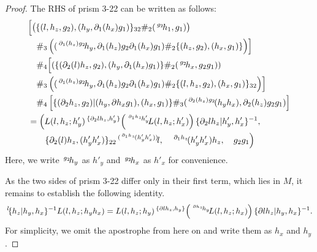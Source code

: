 \documentclass[11pt, reqno]{amsart} %
\newcommand{\act}[1]{\,\sp{#1}\!}
\newcommand{\del}{\partial}
\theoremstyle{definition}
\theoremstyle{remark}
\numberwithin{equation}{section}
\begin{document}
\begin{proof}
The RHS of prism 3-22 can be written as follows:
\begin{align}
  \nonumber
  & 
  \Bigl[
    \big(\{ (l, h_z,g_2), \left(h_y, \del_1(h_x) g_1\right)\}_{32} \#_2 (\act{g_2}h_1, g_1 ) \big) \\
    \nonumber
    &\quad \#_3 
    \left( (\act{\del_1(h_z)g_2}h_y, \del_1(h_z)g_2\del_1(h_x)g_1) \#_2\{ (h_z,g_2), (h_x, g_1)\} \right)
  \Bigr] \\
  \nonumber
  &\quad \#_4
  \Bigl[
    \left(\{(\del_2(l)h_z,g_2), (h_y,\del_1(h_x)g_1) \} \#_2 (\act{g_2}h_x, g_2g_1) \right) \\
    \nonumber
    &\quad \#_3
    \left( (\act{\del_1(h_z)g_2}h_y, \del_1(h_z)g_2\del_1(h_x)g_1)\#_2\{(l,h_z,g_2), (h_x,g_1)\}_{32} \right)
  \Bigr] \\
  \nonumber
  &\quad \#_4 
  \left[ 
    \{(\del_2 h_z, g_2)|(h_y, \del h_x g_1), (h_x, g_1) \} 
    \#_3 
    (\act{\del_2(h_z)g_2}(h_yh_x), \del_2(h_z)g_2g_1) 
  \right] \\
  \nonumber
  &= 
  \Bigl(
    L(l,h_z;h'_y)\act{\{\partial_2 lh_z,h'_y\}}\left(\act{\act{\partial_1 h_z}h'_y}L(l,h_z;h'_x)\right)\{\partial_2 lh_z|h'_y,h'_x\}^{-1}, \\
    &\qquad\{\del_2(l)h_z,(h'_yh'_x)\}_{22}\act{(\act{\del_1 h_z}(h'_yh'_x))}l, \quad
    \act{\del_1 h_z}(h'_yh'_x) h_z, \quad
    g_2g_1 
  \Bigr)
\end{align}
Here, we write $\act{g_2}h_y$ as $h'_y$ and $\act{g_2}h_x$ as $h'_x$ for convenience. 

As the two sides of prism 3-22 differ only in their first term, which lies in $M$, it remains to establish the following identity.
\[
  \act{l}\{h_z|h_y,h_x\}^{-1}L(l,h_z;h_yh_x) = L(l,h_z;h_y)\act{\{\partial lh_z,h_y\}}\left(\act{\act{\partial h_z}h_y}L(l,h_z;h_x)\right)\{\partial lh_z|h_y,h_x\}^{-1}.
\]
For simplicity, we omit the apostrophe from here on and write them as $h_x$ and $h_y$.


\end{proof}
\end{document}
